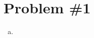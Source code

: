 \documentclass[11pt]{article}
\numberwithin{equation}{section}
\begin{document}


\section{Problem \#1}
\begin{enumerate}[(a)]
\item
\end{enumerate}

\pagebreak
\end{document}
